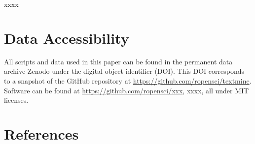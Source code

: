 \documentclass[author-year, review, 11pt]{components/elsarticle} %
\begin{document}
xxxx

\section{Data Accessibility}\label{data-accessibility}

All scripts and data used in this paper can be found in the permanent
data archive Zenodo under the digital object identifier (DOI). This DOI
corresponds to a snapshot of the GitHub repository at
\url{https://github.com/ropensci/textmine}. Software can be found at
\url{https://github.com/ropensci/xxx}, xxxx, all under MIT licenses.

\section{References}\label{references}
\end{document}
